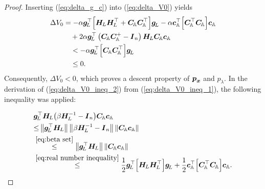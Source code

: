 \documentclass[journal]{IEEEtranTIE}
\begin{document}
\begin{proof}
Inserting (\ref{eq:delta_g_c}) into (\ref{eq:delta_V0}) yields
\begin{subequations}
\begin{align}\nonumber
\Delta V_0 &=  - \alpha {\mv{g}_{\! L}^\top}\Big[ {\mm{H}_{\! L}{\mm{H}_{\! L}^\top} + {\mm{C}_{\!\mathbb{A}}}\mm{C}_{\!\mathbb{A}}^\top}\Big]\mv{g}_{\! L} - \alpha \mv{c}_{\mathbb{A}}^\top\Big[ {\mm{C}_{\!\mathbb{A}}^\top{\mm{C}_{\!\mathbb{A}}}} \Big] \mv{c}_{\mathbb{A}}\\\label{eq:delta_V0_ineq_1}
 &\ \ \ + 2\alpha {\mv{g}_{\! L}^\top}\left( {{\mm{C}_{\!\mathbb{A}}}\mm{C}_{\!\mathbb{A}}^+  - \mm{I}_n} \right)\mm{H}_{\! L}{\mm{C}_{\!\mathbb{A}}}\mv{c}_{\mathbb{A}}\\\label{eq:delta_V0_ineq_2}
 &\ \ \ < - \alpha {\mv{g}_{\! L}^\top}\Big[{\mm{C}_{\!\mathbb{A}} \mm{C}_{\!\mathbb{A}}^\top}\Big]\mv{g}_{\! L} \\\label{eq:delta_V0_ineq_3}
 &\ \ \ \le 0.
\end{align}
\end{subequations}
Consequently, $\Delta V_0 < 0$, which proves a descent property of $\boldsymbol{p}_{\boldsymbol{x}}$ and $p_\lambda$. In the derivation of (\ref{eq:delta_V0_ineq_2}) from (\ref{eq:delta_V0_ineq_1}), the following inequality was applied:

\begin{align}\nonumber
& \mv{g}_{\!L}^\top \mm{H}_{\! L} \big(\beta \mm{H}_{\! L}^{-1} - \mm{I}_n \big) \mm{C}_{\!\mathbb{A}} \mv{c}_{\mathbb{A}} \\
& {\le} \left\| {{\mv{g}_{\! L}^\top}\mm{H}_{\! L}} \right\| \left \| \beta \mm{H}_{\! L}^{-1} - \mm{I}_n \right\| \left \| {{\mm{C}_{\!\mathbb{A}}}\mv{c}_{\mathbb{A}}} \right\| \notag \\
& \stackrel{\eqref{eq:beta set}}{\le} \left\| {{\mv{g}_{\! L}^\top}\mm{H}_{\! L}} \right\| \left \| {{\mm{C}_{\!\mathbb{A}}}\mv{c}_{\mathbb{A}}} \right\| \notag \\
& \stackrel{\eqref{eq:real number inequality}}{\le} \frac{1}{2}{\mv{g}_{\! L}^\top}\Big[ \mm{H}_{\! L}{\mm{H}_{\! L}^\top} \Big]\mv{g}_{\! L} + \frac{1}{2}\mv{c}_{\mathbb{A}}^\top\Big[ \mm{C}_{\!\mathbb{A}}^\top{\mm{C}_{\!\mathbb{A}}} \Big]\mv{c}_{\mathbb{A}}\label{eq:inequality for proof}.
\end{align}


\end{proof}
\end{document}

